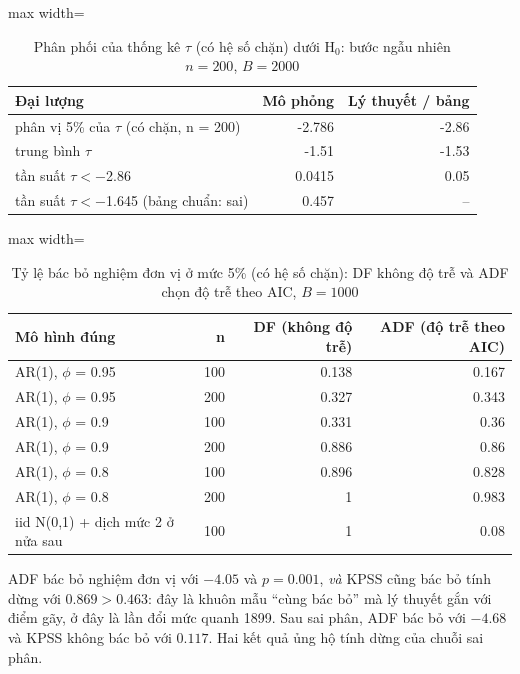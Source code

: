 \begin{table}[H]
\centering\footnotesize
\caption{Phân phối của thống kê $\tau$ (có hệ số chặn) dưới H$_0$: bước ngẫu nhiên $n=200$, $B=2000$}\label{tab:tab_b12_04_null_distribution}
\begin{adjustbox}{max width=\linewidth}
\begin{tabular}{|>{\raggedright\arraybackslash}p{}|r|r|}
\toprule
Đại lượng & Mô phỏng & Lý thuyết / bảng \\
\midrule
phân vị 5\% của $\tau$ (có chặn, n = 200) & -2.786 & -2.86 \\[3pt]
trung bình $\tau$ & -1.51 & -1.53 \\[3pt]
tần suất $\tau < -$2.86 & 0.0415 & 0.05 \\[3pt]
tần suất $\tau < -$1.645 (bảng chuẩn: sai) & 0.457 & – \\[3pt]
\bottomrule
\end{tabular}
\end{adjustbox}
\end{table}
\begin{table}[H]
\centering\footnotesize
\caption{Tỷ lệ bác bỏ nghiệm đơn vị ở mức 5\% (có hệ số chặn): DF không độ trễ và ADF chọn độ trễ theo AIC, $B=1000$}\label{tab:tab_b12_04_adf_power}
\begin{adjustbox}{max width=\linewidth}
\begin{tabular}{|>{\raggedright\arraybackslash}p{}|r|r|r|}
\toprule
Mô hình đúng & n & DF (không độ trễ) & ADF (độ trễ theo AIC) \\
\midrule
AR(1), $\phi$ = 0.95 & 100 & 0.138 & 0.167 \\[3pt]
AR(1), $\phi$ = 0.95 & 200 & 0.327 & 0.343 \\[3pt]
AR(1), $\phi$ = 0.9 & 100 & 0.331 & 0.36 \\[3pt]
AR(1), $\phi$ = 0.9 & 200 & 0.886 & 0.86 \\[3pt]
AR(1), $\phi$ = 0.8 & 100 & 0.896 & 0.828 \\[3pt]
AR(1), $\phi$ = 0.8 & 200 & 1 & 0.983 \\[3pt]
iid N(0,1) + dịch mức 2 ở nửa sau & 100 & 1 & 0.08 \\[3pt]
\bottomrule
\end{tabular}
\end{adjustbox}\par{}
\end{table}
 ADF bác bỏ nghiệm đơn vị với $-4.05$ và $p=0.001$, \emph{và} KPSS cũng bác bỏ tính dừng với $0.869>0.463$: đây là khuôn mẫu ``cùng bác bỏ'' mà lý thuyết gắn với điểm gãy, ở đây là lần đổi mức quanh 1899. Sau sai phân, ADF bác bỏ với $-4.68$ và KPSS không bác bỏ với $0.117$. Hai kết quả ủng hộ tính dừng của chuỗi sai phân.

